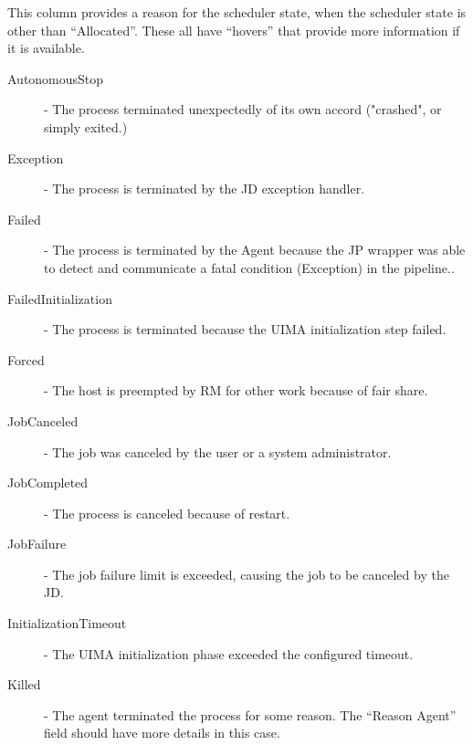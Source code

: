\begin{description}
          This column provides a reason for the scheduler state, when the scheduler state is other than ``Allocated''. 
          These all have ``hovers'' that provide more information
          if it is available.

            \begin{description}          
                \item[AutonomousStop] - The process terminated unexpectedly of its own accord ("crashed", or
                  simply exited.) 

                \item[Exception] - The process is terminated by the JD exception handler. 

                \item[Failed] - The process is terminated by the Agent because the JP wrapper was able to detect and 
                  communicate a fatal condition (Exception) in the pipeline.. 
                  
                \item[FailedInitialization] - The process is terminated because the UIMA initialization step failed. 
                  
                \item[Forced] - The host is preempted by RM for other work because of fair share. 
                  
                \item[JobCanceled] - The job was canceled by the user or a system administrator. 
                  
                \item[JobCompleted] - The process is canceled because of {\DUCC} restart. 
                  
                \item[JobFailure] - The job failure limit is exceeded, causing the job to be canceled by the JD.                    
                  
                \item[InitializationTimeout] - The UIMA initialization phase exceeded the configured timeout. 
                  
                \item[Killed] - The agent terminated the process for some reason. The ``Reason Agent'' field
                  should have more details in this case.
          

\end{description}
\end{description}

